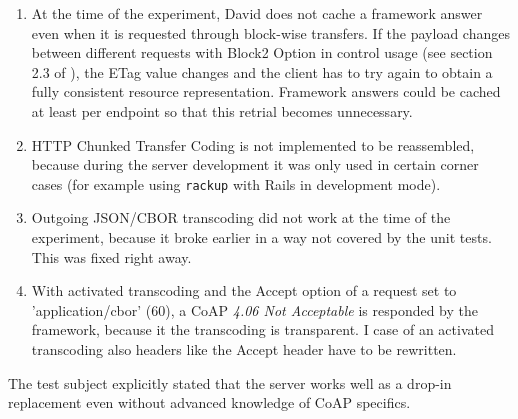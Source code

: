 		\begin{enumerate}
			\item At the time of the experiment, David does not cache a
				framework answer even when it is requested through block-wise
				transfers. If the payload changes between different requests
				with Block2 Option in control usage (see section 2.3 of
				\cite{block}), the ETag value changes and the client has to try
				again to obtain a fully consistent resource representation.
				Framework answers could be cached at least per endpoint so that
				this retrial becomes unnecessary.
			\item \ac{HTTP} Chunked Transfer Coding is not implemented to be
				reassembled, because during the server development it was only
				used in certain corner cases (for example using \texttt{rackup}
				with \ac{Rails} in development mode).
			\item Outgoing \ac{JSON}/\ac{CBOR} transcoding did not work at the
				time of the experiment, because it broke earlier in a way not
				covered by the unit tests. This was fixed right away.
			\item With activated transcoding and the Accept option of a request
				set to 'application/cbor' (60), a \ac{CoAP} \emph{4.06 Not
				Acceptable} is responded by the framework, because it the
				transcoding is transparent. I case of an activated transcoding
				also headers like the Accept header have to be rewritten.
		\end{enumerate}

		The test subject explicitly stated that the server works well as a
		drop-in replacement even without advanced knowledge of \ac{CoAP}
		specifics.

